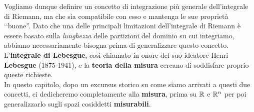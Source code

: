 Vogliamo dunque definire un concetto di integrazione più generale dell'integrale di Riemann, ma che sia compatibile con esso e mantenga le sue proprietà ‘‘buone''. Dato che una delle principali limitazioni dell'integrale di Riemann è essere basato sulla \textit{lunghezza} delle partizioni del dominio su cui integriamo, abbiamo necessariamente bisogna prima di generalizzare questo concetto.\\
L'\textbf{integrale di Lebesgue}, così chiamato in onore del suo ideatore Henri \textbf{Lebesgue} (1875-1941), e la \textbf{teoria della misura} cercano di soddisfare proprio queste richieste.\\
In questo capitolo, dopo un excursus storico su come siamo arrivati a questi due concetti, ci dedicheremo completamente alla \textbf{misura}, prima su $\mathbb{R}$ e $\mathbb{R}^n$ per poi generalizzarlo sugli spazi cosiddetti \textbf{misurabili}.
